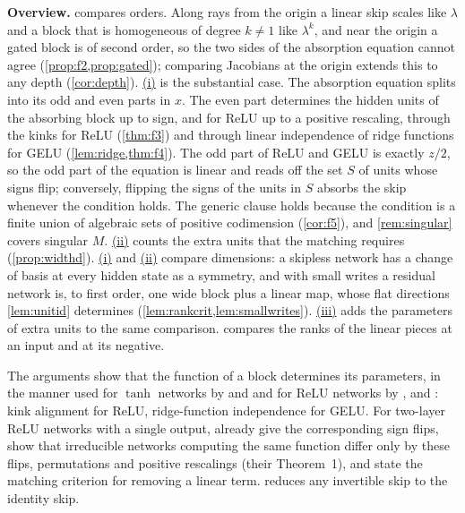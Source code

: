 \documentclass[10pt]{article}
\theoremstyle{definition}
\theoremstyle{remark}
\newcommand{\para}[1]{\smallskip\noindent\textbf{#1}\hspace{0.5em}}
\DeclareRobustCommand{\Cpref}[2]{\hyperref[#1:#2]{\Cref*{#1}(#2)}}
\DeclareRobustCommand{\ptlink}[2]{\hyperref[#1:#2]{(#2)}}
\begin{document}
\para{Overview.}  compares orders. Along rays from the origin a linear skip scales like $\lambda$ and a block that is homogeneous of degree $k \neq 1$ like $\lambda^k$, and near the origin a gated block is of second order, so the two sides of the absorption equation cannot agree (\cref{prop:f2,prop:gated}); comparing Jacobians at the origin extends this to any depth (\cref{cor:depth}). \Cpref{thm:relugelu}{i} is the substantial case. The absorption equation splits into its odd and even parts in $x$. The even part determines the hidden units of the absorbing block up to sign, and for ReLU up to a positive rescaling, through the kinks for ReLU (\cref{thm:f3}) and through linear independence of ridge functions for GELU (\cref{lem:ridge,thm:f4}). The odd part of ReLU and GELU is exactly $z/2$, so the odd part of the equation is linear and reads off the set $S$ of units whose signs flip; conversely, flipping the signs of the units in $S$ absorbs the skip whenever the condition holds. The generic clause holds because the condition is a finite union of algebraic sets of positive codimension (\cref{cor:f5}), and \cref{rem:singular} covers singular $M$. \Cpref{thm:relugelu}{ii} counts the extra units that the matching requires (\cref{prop:widthd}). \Cpref{thm:depthgelu}{i} and \ptlink{thm:depthgelu}{ii} compare dimensions: a skipless network has a change of basis at every hidden state as a symmetry, and with small writes a residual network is, to first order, one wide block plus a linear map, whose flat directions \cref{lem:unitid} determines (\cref{lem:rankcrit,lem:smallwrites}). \Cpref{thm:depthgelu}{iii} adds the parameters of extra units to the same comparison.  compares the ranks of the linear pieces at an input and at its negative.

The arguments show that the function of a block determines its parameters, in the manner used for $\tanh$ networks by \citet{sussmann1992} and \citet{fefferman1994} and for ReLU networks by \citet{buithimai2020functional}, \citet{petzka2020symmetries} and \citet{rolnick2020reverse}: kink alignment for ReLU, ridge-function independence for GELU. For two-layer ReLU networks with a single output, \citet[Section~3]{petzka2020symmetries} already give the corresponding sign flips, show that irreducible networks computing the same function differ only by these flips, permutations and positive rescalings (their Theorem~1), and state the matching criterion for removing a linear term.  reduces any invertible skip to the identity skip.
\end{document}
